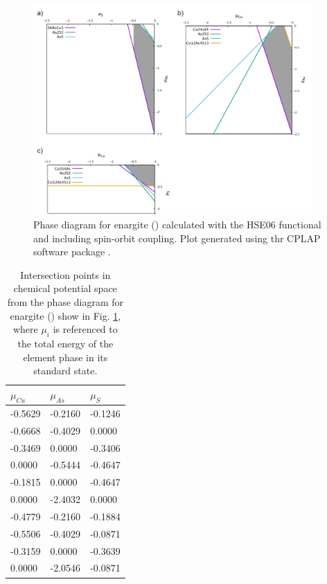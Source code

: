 \documentclass[11pt, twoside]{report}
\begin{document}
\begin{figure}[h!]
    \centering
    \includegraphics[width=0.95\textwidth]{figures/enargite_p_d.png}
    \caption[Phase diagram for enargite ({\enargite}) calculated with the HSE06 functional and including spin-orbit coupling.]{Phase diagram for enargite ({\enargite}) calculated with the HSE06 functional and including spin-orbit coupling. Plot generated using thr CPLAP software package \cite{cplap}.}
    \label{enargite_p_d}
\end{figure}

\begin{table}[]
\begin{tabular}{@{}lll@{}}
\toprule
$\mu_{Cu}$ & $\mu_{As}$ & $\mu_{S}$ \\ \midrule
-0.5629    & -0.2160    & -0.1246   \\
-0.6668    & -0.4029    & 0.0000    \\
-0.3469    & 0.0000     & -0.3406   \\
0.0000     & -0.5444    & -0.4647   \\
-0.1815    & 0.0000     & -0.4647   \\
0.0000     & -2.4032    & 0.0000    \\
-0.4779    & -0.2160    & -0.1884   \\
-0.5506    & -0.4029    & -0.0871   \\
-0.3159    & 0.0000     & -0.3639   \\
0.0000     & -2.0546    & -0.0871   \\ \bottomrule
\end{tabular}
\caption{Intersection points in chemical potential space from the phase diagram for enargite ({\enargite}) show in Fig. \ref{enargite_p_d}, where $\mu_i$ is referenced to the total energy of the element phase in its standard state.}\label{enargite_int_points}
\end{table}
\end{document}
